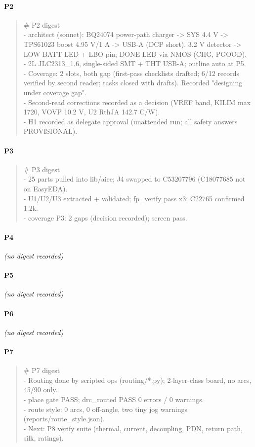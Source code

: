 \documentclass[11pt]{article}
\begin{document}
\paragraph*{P2}
\begin{quote}\small\ttfamily\raggedright
\# P2 digest\\
- architect (sonnet): BQ24074 power-path charger -\textgreater{} SYS 4.4 V -\textgreater{} TPS61023 boost 4.95 V/1 A -\textgreater{} USB-A (DCP short). 3.2 V detector -\textgreater{} LOW-BATT LED + LBO pin; DONE LED via NMOS (CHG, PGOOD).\\
- 2L JLC2313\_1.6, single-sided SMT + THT USB-A; outline auto at P5.\\
- Coverage: 2 slots, both gap (first-pass checklists drafted; 6/12 records verified by second reader; tasks closed with drafts). Recorded "designing under coverage gap".\\
- Second-read corrections recorded as a decision (VREF band, KILIM max 1720, VOVP 10.2 V, U2 RthJA 142.7 C/W).\\
- H1 recorded as delegate approval (unattended run; all safety answers PROVISIONAL).
\end{quote}
\paragraph*{P3}
\begin{quote}\small\ttfamily\raggedright
\# P3 digest\\
- 25 parts pulled into lib/aiee; J4 swapped to C53207796 (C18077685 not on EasyEDA).\\
- U1/U2/U3 extracted + validated; fp\_verify pass x3; C22765 confirmed 1.2k.\\
- coverage P3: 2 gaps (decision recorded); screen pass.
\end{quote}
\paragraph*{P4}
\emph{(no digest recorded)}
\paragraph*{P5}
\emph{(no digest recorded)}
\paragraph*{P6}
\emph{(no digest recorded)}
\paragraph*{P7}
\begin{quote}\small\ttfamily\raggedright
\# P7 digest\\
- Routing done by scripted ops (routing/{*}.py); 2-layer-class board, no arcs, 45/90 only.\\
- place gate PASS; drc\_routed PASS 0 errors / 0 warnings.\\
- route style: 0 arcs, 0 off-angle, two tiny jog warnings (reports/route\_style.json).\\
- Next: P8 verify suite (thermal, current, decoupling, PDN, return path, silk, ratings).
\end{quote}
\end{document}
